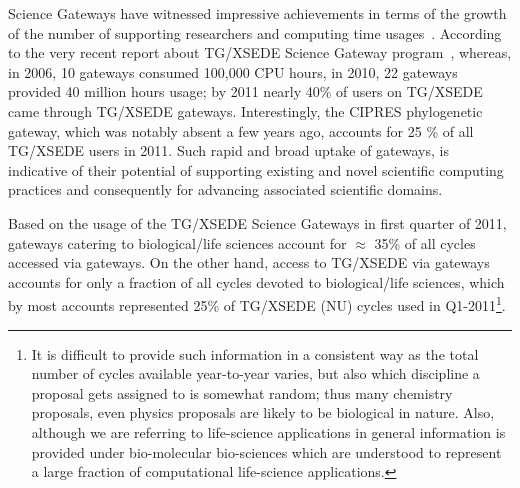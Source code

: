 \documentclass[]{svjour3}
\begin{document}




Science Gateways have witnessed impressive achievements in terms of
the growth of the number of supporting researchers and computing time
usages~\cite{gce11-nancy}. According to the very recent report about
TG/XSEDE Science Gateway program~\cite{gce11-nancy}, whereas, in 2006,
10 gateways consumed 100,000 CPU hours, in 2010, 22 gateways provided
40 million hours usage; by 2011 nearly 40\% of users on TG/XSEDE came
through TG/XSEDE gateways. Interestingly, the CIPRES phylogenetic
gateway, which was notably absent a few years ago, accounts for 25 \%
of all TG/XSEDE users in 2011. Such rapid and broad uptake of
gateways, is indicative of their potential of supporting existing and
novel scientific computing practices and consequently for advancing
associated scientific domains.

 


Based on the usage of the TG/XSEDE Science Gateways in first quarter
of 2011, gateways catering to biological/life sciences account for
$\approx$ 35\% of all cycles accessed via gateways.  On the
other hand, access to TG/XSEDE via gateways accounts for only a
fraction of all cycles devoted to biological/life sciences, which by
most accounts represented 25\% of TG/XSEDE (NU) cycles used in
Q1-2011\footnote{It is difficult to provide such information in a
  consistent way as the total number of cycles available year-to-year
  varies, but also which discipline a proposal gets assigned to is
  somewhat random; thus many chemistry proposals, even physics
  proposals are likely to be biological in nature. Also, although we
  are referring to life-science applications in general information is
  provided under bio-molecular bio-sciences which are understood to
  represent a large fraction of computational life-science
  applications.}.  
\end{document}
